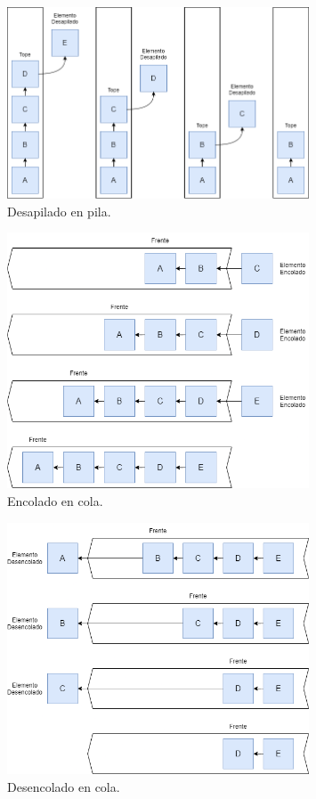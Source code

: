 \documentclass[titlepage,a4paper]{article}
\begin{document}
\begin{figure}[H]
\centering
\includegraphics[width=0.8\textwidth]{pila_desapilado.png}
\caption{\label{fig:seq02}Desapilado en pila.}
\end{figure}


\begin{figure}[H]
\centering
\includegraphics[width=0.8\textwidth]{cola_encolado.png}
\caption{\label{fig:seq03}Encolado en cola.}
\end{figure}


\begin{figure}[H]
\centering
\includegraphics[width=0.8\textwidth]{cola_desencolado.png}
\caption{\label{fig:seq04}Desencolado en cola.}
\end{figure}
\end{document}
